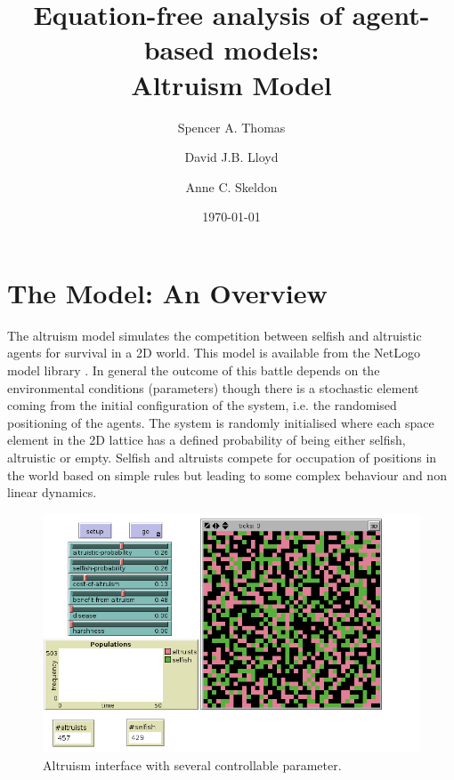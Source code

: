 \documentclass[11pt]{article}
\begin{document}
\title{Equation-free analysis of agent-based models:\\Altruism Model}

\author{Spencer A. Thomas}
\author{David J.B. Lloyd}
\author{Anne C. Skeldon}
\date{\today}
\maketitle



\section{The Model: An Overview}
The altruism model \cite{Altruism} simulates the competition between selfish and altruistic agents for survival in a 2D world. This model is available from the NetLogo model library \cite{Netlogo}. In general the outcome of this battle depends on the environmental conditions (parameters) though there is a stochastic element coming from the initial configuration of the system, i.e. the randomised positioning of the agents. The system is randomly initialised where each space element in the 2D lattice has a defined probability of being either selfish, altruistic or empty. Selfish and altruists compete for occupation of positions in the world based on simple rules but leading to some complex behaviour and non linear dynamics. 


\begin{figure}[h]
        \centering
        		\includegraphics[width=\textwidth]{AltruismInterface.png}
        \caption{Altruism interface with several controllable parameter.\label{altruism}}
\end{figure}
\end{document}
